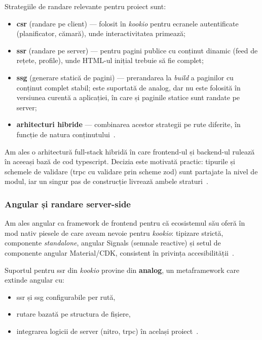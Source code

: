 Strategiile de \gls{randare} relevante pentru proiect sunt:
\begin{itemize}
  \item \textbf{\acrshort{csr}} (randare pe client) --- folosit în \textit{\gls{kookio}} pentru ecranele autentificate (planificator, cămară), unde interactivitatea primează;
  \item \textbf{\acrshort{ssr}} (randare pe server) --- pentru pagini publice cu conținut dinamic (feed de rețete, profile), unde HTML-ul inițial trebuie să fie complet;
  \item \textbf{\acrshort{ssg}} (generare statică de pagini) --- prerandarea la \textit{build} a paginilor cu conținut complet stabil; este suportată de \gls{analog}, dar nu este folosită în versiunea curentă a aplicației, în care și paginile statice sunt randate pe server;
  \item \textbf{arhitecturi hibride} --- combinarea acestor strategii pe rute diferite, în funcție de natura conținutului~\cite{analog}.
\end{itemize}

Am ales o arhitectură full-stack hibridă în care frontend-ul și backend-ul rulează în aceeași bază de cod \gls{typescript}.
Decizia este motivată practic: tipurile și schemele de validare (\gls{trpc} cu validare prin scheme \gls{zod}) sunt partajate la nivel de modul, iar un singur pas de construcție livrează ambele straturi~\cite{trpc,zod}.

\subsubsection{Angular și randare server-side}\label{subsec:angular-ssr}

Am ales \gls{angular} ca framework de frontend pentru că ecosistemul său oferă în mod nativ piesele de care aveam nevoie pentru \textit{\gls{kookio}}: tipizare strictă, componente \textit{standalone}, \gls{angular} Signals (semnale reactive) și setul de componente \gls{angular} Material/CDK, consistent în privința accesibilității~\cite{angular_signals,angular_material}.

Suportul pentru \acrshort{ssr} din \textit{\gls{kookio}} provine din \textbf{\gls{analog}}, un \gls{metaframework} care extinde \gls{angular} cu:
\begin{itemize}
  \item \acrfull{ssr} și \acrfull{ssg} configurabile per rută,
  \item rutare bazată pe structura de fișiere,
  \item integrarea logicii de server (\gls{nitro}, \gls{trpc}) în același proiect~\cite{analog,analog_routing,nitro}.
\end{itemize}

